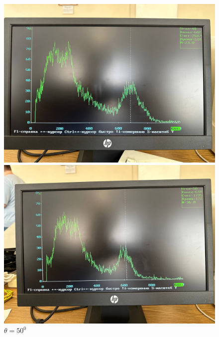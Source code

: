 \documentclass[a4paper, 12pt]{article}
\begin{document}
    \begin{figure}[H]
    \begin{minipage}[h]{0.3\linewidth}
        \includegraphics[width = 1\linewidth]{res/05.jpg}
        \caption{$\theta = 40^0$}
    \end{minipage}
    \hfill
    \begin{minipage}[h]{0.3\linewidth}
        \includegraphics[width = 1\linewidth]{res/06.jpg}
        \caption{$\theta = 50^0$}
    \end{minipage}
    \hfill
    \begin{minipage}[h]{0.3\linewidth}

\end{minipage}
\end{figure}
\end{document}
